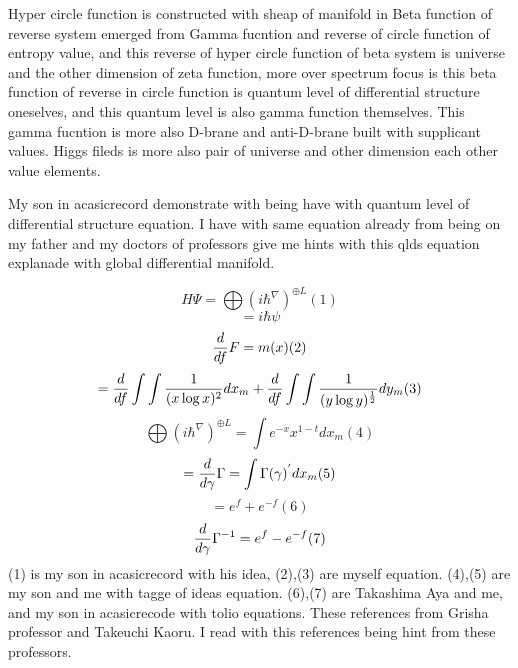 \documentclass{jsarticle}
\begin{document}
    Hyper circle function is constructed with sheap of manifold in 
    Beta function of reverse system emerged from Gamma fucntion 
    and reverse of circle function of entropy value,
    and this reverse of hyper circle function of beta system
    is universe and the other dimension of zeta function,
    more over spectrum focus is this beta function of reverse in
    circle function is quantum level of differential structure oneselves,
    and this quantum level is also gamma function themselves.
    This gamma fucntion is more also D-brane and anti-D-brane built 
    with supplicant values. Higgs fileds is more also pair of universe and
    other dimension each other value elements. 


    My son in acasicrecord demonstrate with being have with quantum level
    of differential structure equation.
    I have with same equation already from being on 
    my father and my doctors of professors give me hints with 
    this qlds equation explanade with global differential manifold.

    $$ H\Psi = \bigoplus {(i \hbar^{\nabla})}^{\oplus L}  (1)$$
    $$ = i\hbar\psi $$
    $$ {d \over df}F = m(x) (2) $$
    $$ = {d \over df}\int \int{1 \over (x \log x)^2}dx_m
    + {d \over df}\int \int{1 \over (y \log y)^{1 \over 2}}dy_m  (3)$$
    $$  \bigoplus {(i \hbar^{\nabla})}^{\oplus L} = \int e^{-x}x^{1 - t}dx_m 
    (4)$$
    $$ = {d \over d \gamma}\Gamma = \int \Gamma(\gamma)^{'}dx_m (5)$$
    $$ = e^f + e^{-f} (6)$$
    $$ {d \over d \gamma}\Gamma^{-1} = e^{f} - e^{-f} (7)$$
    (1) is my son in acasicrecord with his idea, (2),(3) are myself equation.
    (4),(5) are my son and me with tagge of ideas equation.
    (6),(7) are Takashima Aya and me, and my son in acasicrecode with tolio
    equations.
    These references from Grisha professor and Takeuchi Kaoru.
    I read with this references being hint from these professors.
    
\end{document}
